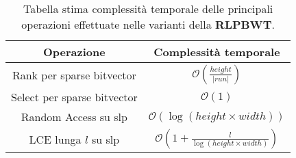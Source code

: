 

\begin{table}[H]
  \centering
   \caption{Tabella stima complessità temporale delle principali operazioni
     effettuate nelle varianti della \textbf{RLPBWT}.}
  \begin{tabular}{c|c}
    Operazione & Complessità temporale\\
    \hline
    Rank per sparse bitvector & $\mathcal{O}(\frac{height}{|run|})$\\
    \hline
    Select per sparse bitvector & $\mathcal{O}(1)$\\
    \hline
    Random Access su slp & $\mathcal{O}(\log (height\times width))$\\
     \hline
    LCE lunga $l$ su slp & $\mathcal{O}\left(1+\frac{l}{\log (height\times
                           width)}\right)$\\                               
  \end{tabular}
  \label{tab:time}
\end{table}